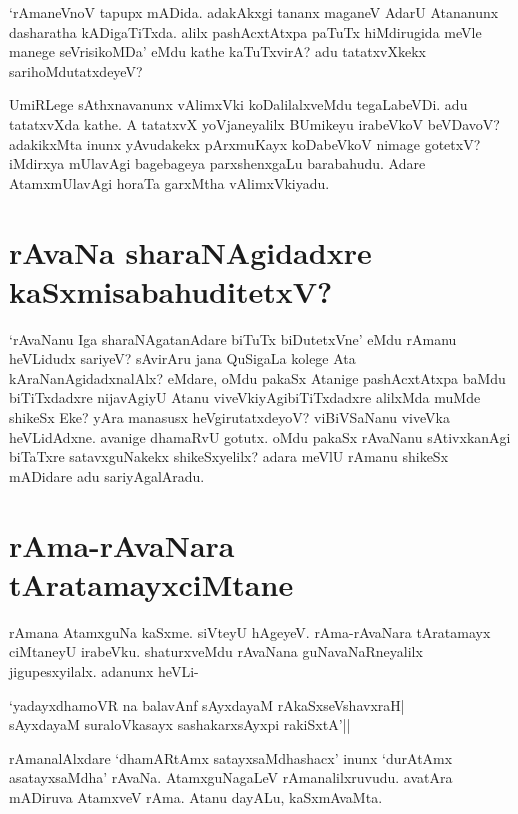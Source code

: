 `rAmaneVnoV tapupx mADida. adakAkxgi tananx maganeV AdarU Atananunx dasharatha kADigaTiTxda. alilx pashAcxtAtxpa paTuTx hiMdirugida meVle manege seVrisikoMDa' eMdu kathe kaTuTxvirA? adu tatatxvXkekx sarihoMdutatxdeyeV?

UmiRLege sAthxnavanunx vAlimxVki koDalilalxveMdu tegaLabeVDi. adu tatatxvXda kathe. A tatatxvX yoVjaneyalilx BUmikeyu irabeVkoV beVDavoV? adakikxMta inunx yAvudakekx pArxmuKayx koDabeVkoV nimage gotetxV? iMdirxya mUlavAgi bagebageya parxshenxgaLu barabahudu. Adare AtamxmUlavAgi horaTa garxMtha vAlimxVkiyadu.

\section*{rAvaNa sharaNAgidadxre kaSxmisabahuditetxV?}

`rAvaNanu Iga sharaNAgatanAdare biTuTx biDutetxVne' eMdu rAmanu heVLidudx  sariyeV? sAvirAru jana QuSigaLa kolege Ata kAraNanAgidadxnalAlx? eMdare, oMdu pakaSx Atanige pashAcxtAtxpa baMdu biTiTxdadxre nijavAgiyU Atanu viveVkiyAgibiTiTxdadxre alilxMda muMde shikeSx Eke? yAra manasusx heVgirutatxdeyoV? viBiVSaNanu viveVka heVLidAdxne. avanige dhamaRvU gotutx. oMdu pakaSx rAvaNanu sAtivxkanAgi biTaTxre satavxguNakekx shikeSxyelilx? adara meVlU rAmanu shikeSx mADidare adu sariyAgalAradu.

\section*{rAma-rAvaNara tAratamayxciMtane}

rAmana AtamxguNa kaSxme. siVteyU hAgeyeV. rAma-rAvaNara tAratamayx ciMtaneyU irabeVku. shaturxveMdu rAvaNana guNavaNaRneyalilx jigupesxyilalx. adanunx heVLi-

\begin{shloka}
`yadayxdhamoVR na balavAnf sAyxdayaM rAkaSxseVshavxraH|\label{215}\\
sAyxdayaM suraloVkasayx sashakarxsAyxpi rakiSxtA'||
\end{shloka}

rAmanalAlxdare `dhamARtAmx satayxsaMdhashacx' inunx `durAtAmx asatayxsaMdha' rAvaNa. AtamxguNagaLeV rAmanalilxruvudu. avatAra mADiruva AtamxveV rAma. Atanu dayALu, kaSxmAvaMta.

